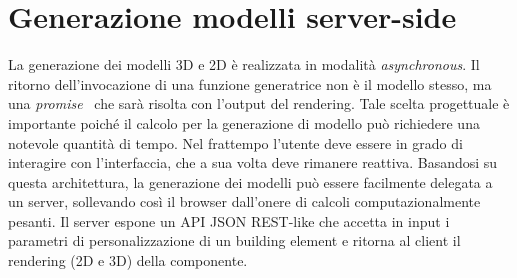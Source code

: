 \section{Generazione modelli server-side}
\label{sec:chapter_3_section_4}

\noindent
La generazione dei modelli 3D e 2D è realizzata in modalità \emph{asynchronous}.
Il ritorno dell'invocazione di una funzione generatrice non \`e il modello stesso,
ma una \emph{promise}~\cite{promisejs} che sarà risolta con l'output del rendering.
Tale scelta progettuale \`e importante poich\'e il calcolo per la
generazione di modello pu\`o richiedere una notevole quantità di tempo.
Nel frattempo l'utente deve essere in grado di interagire con l'interfaccia, che a sua volta deve rimanere reattiva.
Basandosi su questa architettura, la generazione dei modelli può essere facilmente delegata a un server,
sollevando così il browser dall'onere di calcoli computazionalmente pesanti. Il server espone un API JSON REST-like
che accetta in input i parametri di personalizzazione di un building element e ritorna al client il rendering (2D e 3D) della componente.


\newpage
